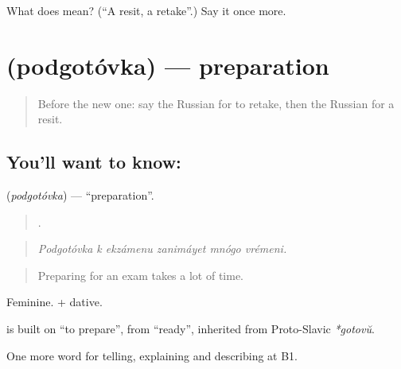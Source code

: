 \begin{tcolorbox}[breakable,colback=teal!4,colframe=teal!35!black,title={Before you move on}]
What does  mean? (\textquotedblleft{}A resit, a retake\textquotedblright{}.) Say it once more.
\end{tcolorbox}
\section[\texorpdfstring{\ru{подготовка} (podgotóvka)}{подготовка (podgotóvka)}]{ (podgotóvka) — preparation}

\label{lesson:RU-C382-podgotovka}



\begin{quote}
Before the new one: say the Russian for to retake, then the Russian for a resit.
\end{quote}

\subsection*{You'll want to know: }
\textbf{} (\emph{podgotóvka}) — \textquotedblleft{}preparation\textquotedblright{}.

\begin{quote}
     .
\end{quote}

\begin{quote}
\emph{Podgotóvka k ekzámenu zanimáyet mnógo vrémeni.}
\end{quote}

\begin{quote}
Preparing for an exam takes a lot of time.
\end{quote}

Feminine. \emph{ } + dative.

\begin{cousinweb}
\textbf{} is built on \emph{} \textquotedblleft{}to prepare\textquotedblright{}, from \emph{} \textquotedblleft{}ready\textquotedblright{}, inherited from Proto-Slavic \emph{*gotovŭ}.
\end{cousinweb}

\begin{grammarlens}[title={What you've built}]
One more word for telling, explaining and describing at B1.
\end{grammarlens}

